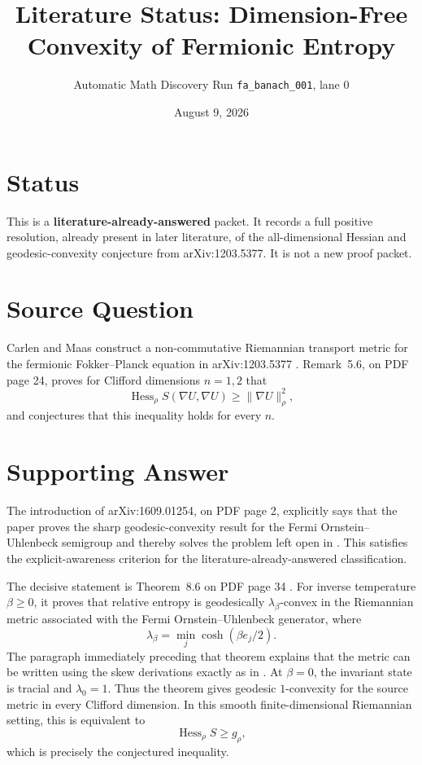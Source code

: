 \documentclass[11pt]{article}
\title{Literature Status: Dimension-Free Convexity of Fermionic Entropy}
\author{Automatic Math Discovery Run \texttt{fa\_banach\_001}, lane 0}
\date{August 9, 2026}
\begin{document}
\maketitle

\section*{Status}

This is a \textbf{literature-already-answered} packet. It records a full
positive resolution, already present in later literature, of the
all-dimensional Hessian and geodesic-convexity conjecture from
arXiv:1203.5377. It is not a new proof packet.

\section*{Source Question}

Carlen and Maas construct a non-commutative Riemannian transport metric for
the fermionic Fokker--Planck equation in arXiv:1203.5377 \cite{CM14}.
Remark~5.6, on PDF page 24, proves for Clifford dimensions \(n=1,2\) that
\[
  \operatorname{Hess}_{\rho} S(\nabla U,\nabla U)
  \geq \|\nabla U\|_{\rho}^{2},
\]
and conjectures that this inequality holds for every \(n\).

\section*{Supporting Answer}

The introduction of arXiv:1609.01254, on PDF page 2, explicitly says that the
paper proves the sharp geodesic-convexity result for the Fermi
Ornstein--Uhlenbeck semigroup and thereby solves the problem left open in
\cite{CM14}. This satisfies the explicit-awareness criterion for the
literature-already-answered classification.

The decisive statement is Theorem~8.6 on PDF page 34 \cite{CM17}. For inverse
temperature \(\beta\geq0\), it proves that relative entropy is geodesically
\(\lambda_\beta\)-convex in the Riemannian metric associated with the Fermi
Ornstein--Uhlenbeck generator, where
\[
  \lambda_\beta=\min_j\cosh(\beta e_j/2).
\]
The paragraph immediately preceding that theorem explains that the metric can
be written using the skew derivations exactly as in \cite{CM14}. At
\(\beta=0\), the invariant state is tracial and \(\lambda_0=1\). Thus the
theorem gives geodesic \(1\)-convexity for the source metric in every Clifford
dimension. In this smooth finite-dimensional Riemannian setting, this is
equivalent to
\[
  \operatorname{Hess}_{\rho} S \geq g_{\rho},
\]
which is precisely the conjectured inequality.
\end{document}
